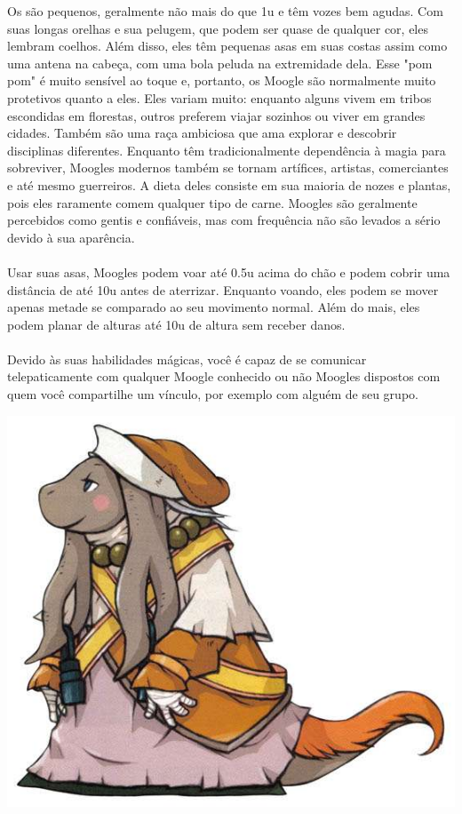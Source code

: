 %
Os  são pequenos, geralmente não mais do que 1u e têm vozes bem agudas.
Com suas longas orelhas e sua pelugem, que podem ser quase de qualquer cor, eles lembram coelhos.
Além disso, eles têm pequenas asas em suas costas assim como uma antena na cabeça, com uma bola peluda na extremidade dela.
Esse "pom pom" é muito sensível ao toque e, portanto, os Moogle são normalmente muito protetivos quanto a eles.
Eles variam muito: enquanto alguns vivem em tribos escondidas em florestas, outros preferem viajar sozinhos ou viver em grandes cidades.
Também são uma raça ambiciosa que ama explorar e descobrir disciplinas diferentes.
Enquanto têm tradicionalmente dependência à magia para sobreviver, Moogles modernos também se tornam artífices, artistas, comerciantes e até mesmo guerreiros.
A dieta deles consiste em sua maioria de nozes e plantas, pois eles raramente comem qualquer tipo de carne.
Moogles são geralmente percebidos como gentis e confiáveis, mas com frequência não são levados a sério devido à sua aparência. 
%
\\\\
%
 Usar suas asas, Moogles podem voar até 0.5u acima do chão e podem cobrir uma distância de até 10u antes de aterrizar.
Enquanto voando, eles podem se mover apenas metade se comparado ao seu movimento normal.
Além do mais, eles podem planar de alturas até 10u de altura sem receber danos.
%
\\\\
%
 Devido às suas habilidades mágicas, você é capaz de se comunicar telepaticamente com qualquer Moogle conhecido ou não Moogles dispostos com quem você compartilhe um vínculo, por exemplo com alguém de seu grupo.
%
\newpage
%
\\
%
\begin{center} \includegraphics[width=\columnwidth]{./art/races/numou.jpg} \end{center}
